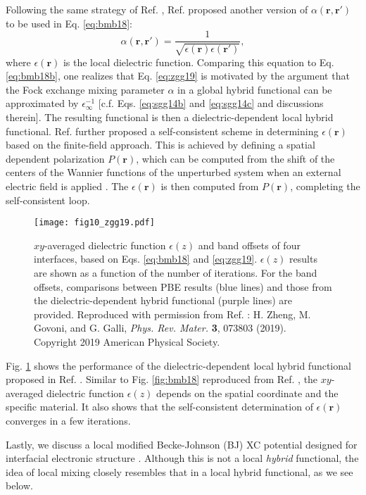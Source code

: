 \documentclass[aip, amsmath, amssymb, reprint, longbibliography]{revtex4-2}
\def\mr{\mathbf{r}}
\begin{document}
Following the same strategy of Ref. , Ref.  proposed another version of $\alpha(\mr,\mr')$ to be used in Eq. \eqref{eq:bmb18}:
\begin{equation}
\alpha(\mr,\mr')=\frac{1}{\sqrt{\epsilon(\mr)\epsilon(\mr')}},
\label{eq:zgg19}
\end{equation}
where $\epsilon(\mr)$ is the local dielectric function. Comparing this equation to Eq. \eqref{eq:bmb18b}, one realizes that Eq. \eqref{eq:zgg19} is motivated by the argument that the Fock exchange mixing parameter $\alpha$ in a global hybrid functional can be approximated by $\epsilon_\infty^{-1}$ [c.f. Eqs. \eqref{eq:sgg14b} and \eqref{eq:sgg14c} and discussions therein]. The resulting functional is then a dielectric-dependent local hybrid functional. Ref.  further proposed a self-consistent scheme in determining $\epsilon(\mr)$ based on the finite-field approach. This is achieved by defining a spatial dependent polarization $P(\mr)$, which can be computed from the shift of the centers of the Wannier functions of the unperturbed system when an external electric field is applied \cite{KV93}. The $\epsilon(\mr)$ is then computed from $P(\mr)$, completing the self-consistent loop.

\begin{figure}[htp]
\centering
\texttt{[image: fig10\_zgg19.pdf]}
\caption{$xy$-averaged dielectric function $\epsilon(z)$ and band offsets of four interfaces, based on Eqs. \eqref{eq:bmb18} and \eqref{eq:zgg19}. $\epsilon(z)$ results are shown as a function of the number of iterations. For the band offsets, comparisons between PBE results (blue lines) and those from the dielectric-dependent hybrid functional (purple lines) are provided. Reproduced with
permission from Ref. : H. Zheng, M. Govoni, and G. Galli, \emph{Phys. Rev. Mater.} \textbf{3}, 073803 (2019). Copyright 2019 American Physical Society.}
\label{fig:zgg19}
\end{figure}

Fig. \ref{fig:zgg19} shows the performance of the dielectric-dependent local hybrid functional proposed in Ref. . Similar to Fig. \ref{fig:bmb18} reproduced from Ref. , the $xy$-averaged dielectric function $\epsilon(z)$ depends on the spatial coordinate and the specific material. It also shows that the self-consistent determination of $\epsilon(\mr)$ converges in a few iterations.

Lastly, we discuss a local modified Becke-Johnson (BJ) XC potential designed for interfacial electronic structure \cite{RMB20}. Although this is not a local \emph{hybrid} functional, the idea of local mixing closely resembles that in a local hybrid functional, as we see below.
\end{document}
